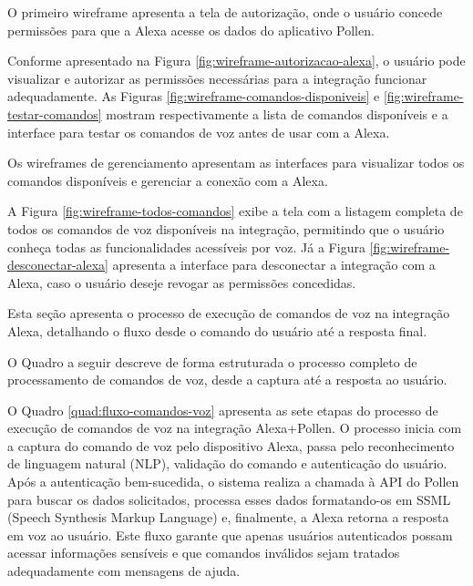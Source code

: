 
O primeiro wireframe apresenta a tela de autorização, onde o usuário concede permissões para que a Alexa acesse os dados do aplicativo Pollen.



Conforme apresentado na Figura \ref{fig:wireframe-autorizacao-alexa}, o usuário pode visualizar e autorizar as permissões necessárias para a integração funcionar adequadamente. As Figuras \ref{fig:wireframe-comandos-disponiveis} e \ref{fig:wireframe-testar-comandos} mostram respectivamente a lista de comandos disponíveis e a interface para testar os comandos de voz antes de usar com a Alexa.


Os wireframes de gerenciamento apresentam as interfaces para visualizar todos os comandos disponíveis e gerenciar a conexão com a Alexa.



A Figura \ref{fig:wireframe-todos-comandos} exibe a tela com a listagem completa de todos os comandos de voz disponíveis na integração, permitindo que o usuário conheça todas as funcionalidades acessíveis por voz. Já a Figura \ref{fig:wireframe-desconectar-alexa} apresenta a interface para desconectar a integração com a Alexa, caso o usuário deseje revogar as permissões concedidas.

\label{sec:fluxo-processamento}

Esta seção apresenta o processo de execução de comandos de voz na integração Alexa, detalhando o fluxo desde o comando do usuário até a resposta final.


O Quadro a seguir descreve de forma estruturada o processo completo de processamento de comandos de voz, desde a captura até a resposta ao usuário.



O Quadro \ref{quad:fluxo-comandos-voz} apresenta as sete etapas do processo de execução de comandos de voz na integração Alexa+Pollen. O processo inicia com a captura do comando de voz pelo dispositivo Alexa, passa pelo reconhecimento de linguagem natural (NLP), validação do comando e autenticação do usuário. Após a autenticação bem-sucedida, o sistema realiza a chamada à API do Pollen para buscar os dados solicitados, processa esses dados formatando-os em SSML (Speech Synthesis Markup Language) e, finalmente, a Alexa retorna a resposta em voz ao usuário. Este fluxo garante que apenas usuários autenticados possam acessar informações sensíveis e que comandos inválidos sejam tratados adequadamente com mensagens de ajuda.


